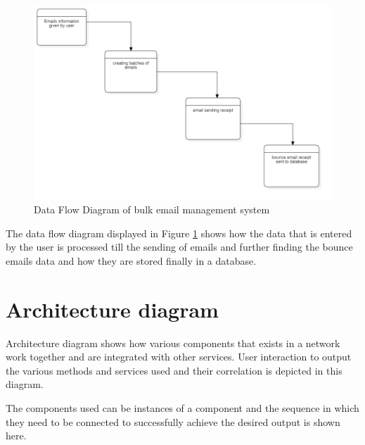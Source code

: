 \begin{figure}[H]
            \centering
            \includegraphics[width=160mm]{figures/data_flow_diagram.png}
            \caption{Data Flow Diagram of bulk email management system}
	    \label{fig:data-flow-diagram}
\end{figure}


The data flow diagram displayed in Figure \ref{fig:data-flow-diagram} shows how the data that is entered by the user is processed till the sending of emails and further finding the bounce emails data and how they are stored finally in a database.

\section{Architecture diagram}

Architecture diagram shows how various components that exists in a network work together and are integrated with other services. User interaction to output the various methods and services used and their correlation is depicted in this diagram.

The components used can be instances of a component and the sequence in which they need to be connected to successfully achieve the desired output is shown here.

